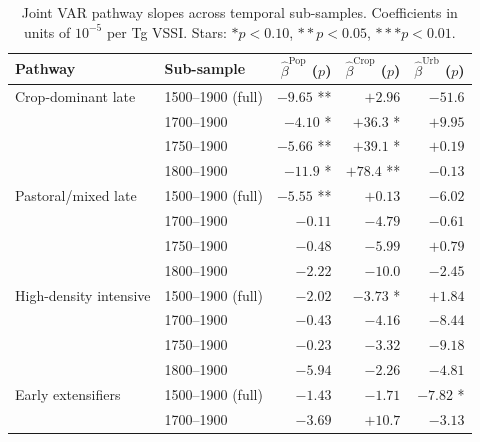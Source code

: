 \documentclass[11pt,letterpaper]{article}
\begin{document}
\begin{table}[H]
\centering
\caption{Joint VAR pathway slopes across temporal sub-samples. Coefficients in units of $10^{-5}$ per Tg VSSI. Stars: $* p<0.10$, $** p<0.05$, $*** p<0.01$.}
\label{tab:joint-var-post1700}
\small
\begin{tabular}{llrrr}
\toprule
Pathway & Sub-sample & $\hat\beta^{\text{Pop}}$ ($p$) & $\hat\beta^{\text{Crop}}$ ($p$) & $\hat\beta^{\text{Urb}}$ ($p$) \\
\midrule
Crop-dominant late    & 1500--1900 (full)       & $-9.65$ \quad ***  & $+2.96$           & $-51.6$        \\
                       & 1700--1900               & $-4.10$ \quad **   & $+36.3$ \quad **  & $+9.95$         \\
                       & 1750--1900               & $-5.66$ \quad ***  & $+39.1$ \quad **  & $+0.19$         \\
                       & 1800--1900               & $-11.9$ \quad **   & $+78.4$ \quad *** & $-0.13$         \\
\midrule
Pastoral/mixed late   & 1500--1900 (full)       & $-5.55$ \quad ***  & $+0.13$           & $-6.02$ \quad * \\
                       & 1700--1900               & $-0.11$           & $-4.79$           & $-0.61$         \\
                       & 1750--1900               & $-0.48$           & $-5.99$           & $+0.79$         \\
                       & 1800--1900               & $-2.22$           & $-10.0$           & $-2.45$         \\
\midrule
High-density intensive & 1500--1900 (full)       & $-2.02$           & $-3.73$ \quad **  & $+1.84$         \\
                       & 1700--1900               & $-0.43$           & $-4.16$ \quad *   & $-8.44$         \\
                       & 1750--1900               & $-0.23$           & $-3.32$           & $-9.18$         \\
                       & 1800--1900               & $-5.94$ \quad *   & $-2.26$           & $-4.81$         \\
\midrule
Early extensifiers    & 1500--1900 (full)       & $-1.43$           & $-1.71$           & $-7.82$ \quad ** \\
                       & 1700--1900               & $-3.69$ \quad *   & $+10.7$           & $-3.13$         \\

\end{tabular}
\end{table}
\end{document}
